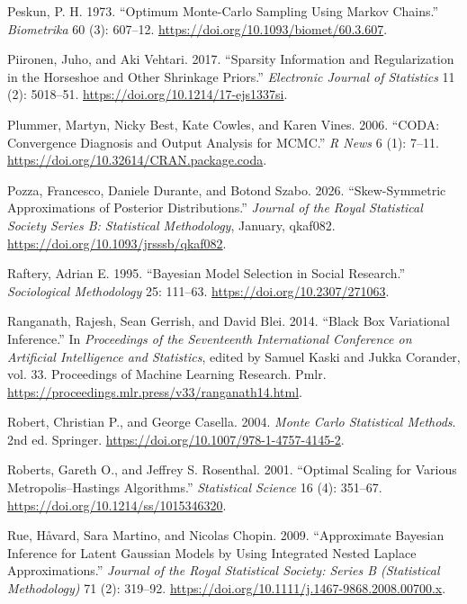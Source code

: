 \documentclass[
  11pt,
  letterpaper,
]{scrbook}
\newlength{\cslhangindent}
\newenvironment{CSLReferences}[2] %
 {\begin{list}{}{%
  \setlength{\itemindent}{0pt}
  \setlength{\leftmargin}{0pt}
  \setlength{\parsep}{0pt}
  \ifodd #1
   \setlength{\leftmargin}{\cslhangindent}
   \setlength{\itemindent}{-1\cslhangindent}
  \fi
  \setlength{\itemsep}{#2\baselineskip}}}
 {\end{list}}
\theoremstyle{definition}
\theoremstyle{plain}
\theoremstyle{plain}
\theoremstyle{plain}
\theoremstyle{definition}
\theoremstyle{definition}
\theoremstyle{plain}
\theoremstyle{plain}
\theoremstyle{remark}
\begin{document}
\begin{CSLReferences}{1}{1}
Peskun, P. H. 1973. {``Optimum {M}onte-{C}arlo Sampling Using {M}arkov
Chains.''} \emph{Biometrika} 60 (3): 607--12.
\url{https://doi.org/10.1093/biomet/60.3.607}.

Piironen, Juho, and Aki Vehtari. 2017. {``Sparsity Information and
Regularization in the Horseshoe and Other Shrinkage Priors.''}
\emph{Electronic Journal of Statistics} 11 (2): 5018--51.
\url{https://doi.org/10.1214/17-ejs1337si}.

Plummer, Martyn, Nicky Best, Kate Cowles, and Karen Vines. 2006.
{``{CODA}: Convergence Diagnosis and Output Analysis for {MCMC}.''}
\emph{R News} 6 (1): 7--11.
\url{https://doi.org/10.32614/CRAN.package.coda}.

Pozza, Francesco, Daniele Durante, and Botond Szabo. 2026.
{``Skew-Symmetric Approximations of Posterior Distributions.''}
\emph{Journal of the Royal Statistical Society Series B: Statistical
Methodology}, January, qkaf082.
\url{https://doi.org/10.1093/jrsssb/qkaf082}.

Raftery, Adrian E. 1995. {``Bayesian Model Selection in Social
Research.''} \emph{Sociological Methodology} 25: 111--63.
\url{https://doi.org/10.2307/271063}.

Ranganath, Rajesh, Sean Gerrish, and David Blei. 2014. {``Black Box
Variational Inference.''} In \emph{Proceedings of the Seventeenth
International Conference on Artificial Intelligence and Statistics},
edited by Samuel Kaski and Jukka Corander, vol. 33. Proceedings of
Machine Learning Research. Pmlr.
\url{https://proceedings.mlr.press/v33/ranganath14.html}.

Robert, Christian P., and George Casella. 2004. \emph{{M}onte {C}arlo
Statistical Methods}. 2nd ed. Springer.
\url{https://doi.org/10.1007/978-1-4757-4145-2}.

Roberts, Gareth O., and Jeffrey S. Rosenthal. 2001. {``Optimal Scaling
for Various {M}etropolis--{H}astings Algorithms.''} \emph{Statistical
Science} 16 (4): 351--67. \url{https://doi.org/10.1214/ss/1015346320}.

Rue, Håvard, Sara Martino, and Nicolas Chopin. 2009. {``Approximate
Bayesian Inference for Latent {G}aussian Models by Using Integrated
Nested {L}aplace Approximations.''} \emph{Journal of the Royal
Statistical Society: Series B (Statistical Methodology)} 71 (2):
319--92. \url{https://doi.org/10.1111/j.1467-9868.2008.00700.x}.


\end{CSLReferences}
\end{document}
